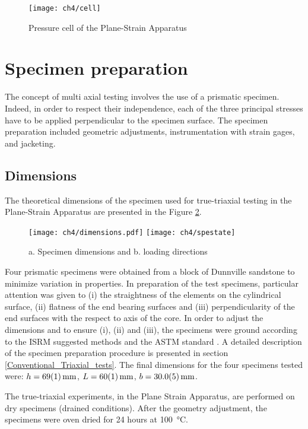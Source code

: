 \begin{figure}[p]
    \centering
    \texttt{[image: ch4/cell]}
    \caption{Pressure cell of the Plane-Strain Apparatus}
    \label{fig4:4}
\end{figure} 

\section{Specimen preparation}

The concept of multi axial testing involves the use of a prismatic specimen. Indeed, in order to respect their independence, each of the three principal stresses have to be applied perpendicular to the specimen surface. The specimen preparation included geometric adjustments, instrumentation with strain gages, and jacketing. 

\subsection{Dimensions}

The theoretical dimensions of the specimen used for true-triaxial testing in the Plane-Strain Apparatus are presented in the Figure \ref{fig4:5}. 

\begin{figure}[tb]
    \centering
    \texttt{[image: ch4/dimensions.pdf]}
    \texttt{[image: ch4/spestate]}
    \caption{a. Specimen dimensions and b. loading directions}
    \label{fig4:5}
\end{figure} 

Four prismatic specimens were obtained from a block of Dunnville sandstone to minimize variation in properties. In preparation of the test specimens, particular attention was given to (i) the straightness of the elements on the cylindrical surface, (ii) flatness of the end bearing surfaces and (iii) perpendicularity of the end surfaces with the respect to axis of the core. In order to adjust the dimensions and to ensure (i), (ii) and (iii), the specimens were ground according to the ISRM suggested methods \cite{ISRM2015} and the ASTM standard \cite{ASTM2019}. A detailed description of the specimen preparation procedure is presented in section \ref{Conventional_Triaxial_tests}. The final dimensions for the four specimens tested were: $h=\SI{69+-1}{\milli\meter}$, $L=\SI{60+-1}{\milli\meter}$, 
$b=\SI{30+-0.5}{\milli\meter}$.

The true-triaxial experiments, in the Plane Strain Apparatus, are performed on dry specimens (drained conditions). After the geometry adjustment, the specimens were oven dried for 24 hours at \SI{100}{\celsius}.

